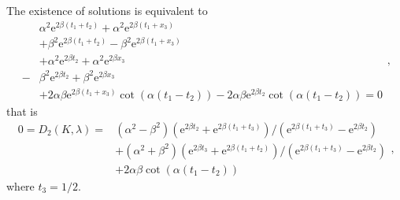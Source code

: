 \documentclass[a4paper,11pt]{article}
\begin{document}
\begin{appendices}
The existence of solutions is equivalent to
\begin{equation*}
\begin{split}
& \alpha^2 \mathrm{e}^{2 \beta (t_1 + t_2)}  + \alpha^2 \mathrm{e}^{2 \beta (t_1 + x_{3})} \\
& + \beta^2 \mathrm{e}^{2 \beta (t_1 + t_2)} - \beta^2 \mathrm{e}^{2 \beta (t_1 + x_{3})} \\
& + \alpha^2 \mathrm{e}^{2 \beta t_2}  + \alpha^2 \mathrm{e}^{2 \beta x_{3}} \\
- & \beta^2 \mathrm{e}^{2 \beta t_2} + \beta^2 \mathrm{e}^{2 \beta x_{3}} \\
& + 2 \alpha \beta \mathrm{e}^{2 \beta (t_1 + x_{3})} \cot(\alpha (t_1 - t_2)) - 2 \alpha \beta \mathrm{e}^{2 \beta t_2} \cot(\alpha (t_1 - t_2)) = 0
\end{split},
\end{equation*}
that is
\begin{equation*}
\begin{split}
0 = D_2(K, \lambda) = & (\alpha^2 - \beta^2)(\mathrm{e}^{2 \beta t_2} + \mathrm{e}^{2 \beta (t_1+t_3)}) / (\mathrm{e}^{2 \beta (t_1+t_3)} - \mathrm{e}^{2 \beta t_2}) \\
& + (\alpha^2 + \beta^2)(\mathrm{e}^{2 \beta t_3} + \mathrm{e}^{2 \beta (t_1+t_2)}) / (\mathrm{e}^{2 \beta (t_1+t_3)} - \mathrm{e}^{2 \beta t_2}) \\
& + 2 \alpha \beta \cot(\alpha (t_1 - t_2))
\end{split},
\end{equation*}
where $t_3 = 1/2$.

\end{appendices}
\end{document}
